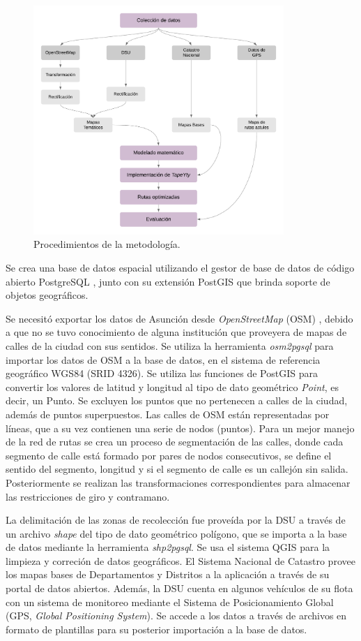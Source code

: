 \documentclass[spanish, conference]{IEEEtran}
\begin{document}
\begin{figure}[tbp]
\centerline{\includegraphics[width=9.5cm]{imagenes/DiagramaDeMetodologia.png}}
\caption{Procedimientos de la metodología.}
\label{fig:metodologia}
\end{figure}

Se crea una base de datos espacial utilizando el gestor de base de datos de código abierto PostgreSQL \cite{PostgreSQL}, junto con su extensión PostGIS \cite{PostGIS} que brinda soporte de objetos geográficos.

Se necesitó exportar los datos de Asunción desde \textit{OpenStreetMap} (OSM) \cite{OpenStreetMap}, debido a que no se tuvo conocimiento de alguna institución que proveyera de mapas de calles de la ciudad con sus sentidos. Se utiliza la herramienta \textit{osm2pgsql} para importar los datos de OSM a la base de datos, en el sistema de referencia geográfico WGS84 (SRID 4326). Se utiliza las funciones de PostGIS para convertir los valores de latitud y longitud al tipo de dato geométrico \textit{Point}, es decir, un Punto. Se excluyen los puntos que no pertenecen a calles de la ciudad, además de puntos superpuestos. Las calles de OSM están representadas por líneas, que a su vez contienen una serie de nodos (puntos). Para un mejor manejo de la red de rutas se crea un proceso de segmentación de las calles, donde cada segmento de calle está formado por pares de nodos consecutivos, se define el sentido del segmento, longitud y si el segmento de calle es un callejón sin salida. Posteriormente se realizan las transformaciones correspondientes para almacenar las restricciones de giro y contramano.

La delimitación de las zonas de recolección fue proveída por la DSU a través de un archivo \textit{shape} del tipo de dato geométrico polígono, que se importa a la base de datos mediante la herramienta \textit{shp2pgsql}. Se usa el sistema QGIS para la limpieza y correción de datos geográficos. El Sistema Nacional de Catastro provee los mapas bases de Departamentos y Distritos a la aplicación a través de su portal de datos abiertos. Además, la DSU cuenta en  algunos  vehículos  de  su  flota con un sistema de monitoreo mediante el Sistema de Posicionamiento Global (GPS, \textit{Global Positioning System}). Se accede a los datos a través de archivos en formato de plantillas para su posterior importación a la base de datos.
\end{document}
